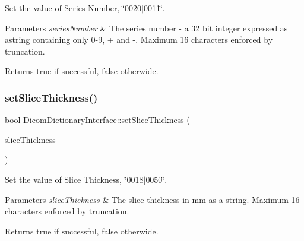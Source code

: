 Set the value of Series Number, \char`\"{}0020$\vert$0011\char`\"{}. 


\begin{DoxyParams}{Parameters}
{\em series\+Number} & The series number -\/ a 32 bit integer expressed as astring containing only \textquotesingle{}0\textquotesingle{}-\/\textquotesingle{}9\textquotesingle{}, \textquotesingle{}+\textquotesingle{} and \textquotesingle{}-\/\textquotesingle{}. Maximum 16 characters enforced by truncation. \\
\hline
\end{DoxyParams}
\begin{DoxyReturn}{Returns}
true if successful, false otherwide. 
\end{DoxyReturn}
\mbox{\label{class_dicom_dictionary_interface_a8a12e59b9a2fd11c4113b655dc51ea6c}} 
\subsubsection{\texorpdfstring{set\+Slice\+Thickness()}{setSliceThickness()}}
{\footnotesize\ttfamily bool Dicom\+Dictionary\+Interface\+::set\+Slice\+Thickness (\begin{DoxyParamCaption}\item[{Q\+String}]{slice\+Thickness }\end{DoxyParamCaption})}



Set the value of Slice Thickness, \char`\"{}0018$\vert$0050\char`\"{}. 


\begin{DoxyParams}{Parameters}
{\em slice\+Thickness} & The slice thickness in mm as a string. Maximum 16 characters enforced by truncation. \\
\hline
\end{DoxyParams}
\begin{DoxyReturn}{Returns}
true if successful, false otherwide. 
\end{DoxyReturn}
\mbox{\label{class_dicom_dictionary_interface_aba913a5b641397061a8166a2a242bf29}} 

